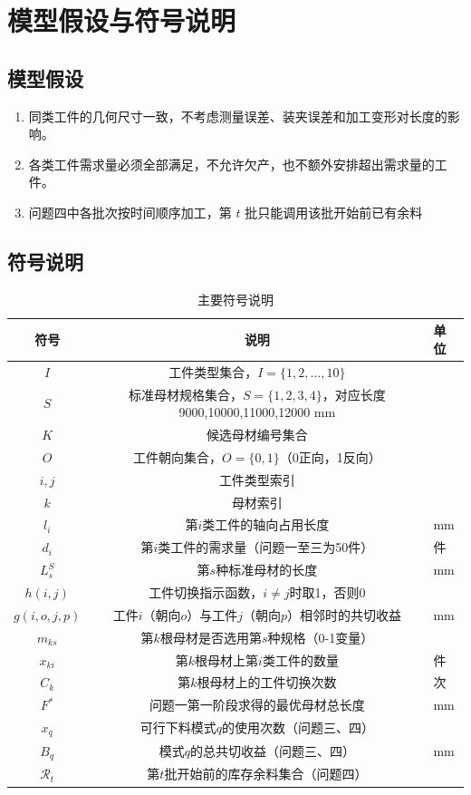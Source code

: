 \documentclass[UTF8]{ctexart}
\begin{document}
\section{模型假设与符号说明}

\subsection{模型假设}
\begin{enumerate}
    \item 同类工件的几何尺寸一致，不考虑测量误差、装夹误差和加工变形对长度的影响。
    \item 各类工件需求量必须全部满足，不允许欠产，也不额外安排超出需求量的工件。
    \item 问题四中各批次按时间顺序加工，第 $t$ 批只能调用该批开始前已有余料
\end{enumerate}

\subsection{符号说明}
\begin{table}[htbp]
\centering
\caption{主要符号说明}
\label{tab:symbols}
\begin{tabular}{ccl}
\toprule
符号 & 说明 & 单位 \\
\midrule
$I$ & 工件类型集合，$I=\{1,2,\ldots,10\}$ & \\
$S$ & 标准母材规格集合，$S=\{1,2,3,4\}$，对应长度9000,10000,11000,12000 mm & \\
$K$ & 候选母材编号集合 & \\
$O$ & 工件朝向集合，$O=\{0,1\}$（0正向，1反向） & \\
$i,j$ & 工件类型索引 & \\
$k$ & 母材索引 & \\
$l_i$ & 第$i$类工件的轴向占用长度 & mm \\
$d_i$ & 第$i$类工件的需求量（问题一至三为50件） & 件 \\
$L_s^S$ & 第$s$种标准母材的长度 & mm \\
$h(i,j)$ & 工件切换指示函数，$i\neq j$时取1，否则0 & \\
$g(i,o,j,p)$ & 工件$i$（朝向$o$）与工件$j$（朝向$p$）相邻时的共切收益 & mm \\
$m_{ks}$ & 第$k$根母材是否选用第$s$种规格（0-1变量） & \\
$x_{ki}$ & 第$k$根母材上第$i$类工件的数量 & 件 \\
$C_k$ & 第$k$根母材上的工件切换次数 & 次 \\
$F^*$ & 问题一第一阶段求得的最优母材总长度 & mm \\
$x_q$ & 可行下料模式$q$的使用次数（问题三、四） & \\
$B_q$ & 模式$q$的总共切收益（问题三、四） & mm \\
$\mathcal{R}_t$ & 第$t$批开始前的库存余料集合（问题四） & \\
\bottomrule
\end{tabular}
\end{table}
\end{document}
